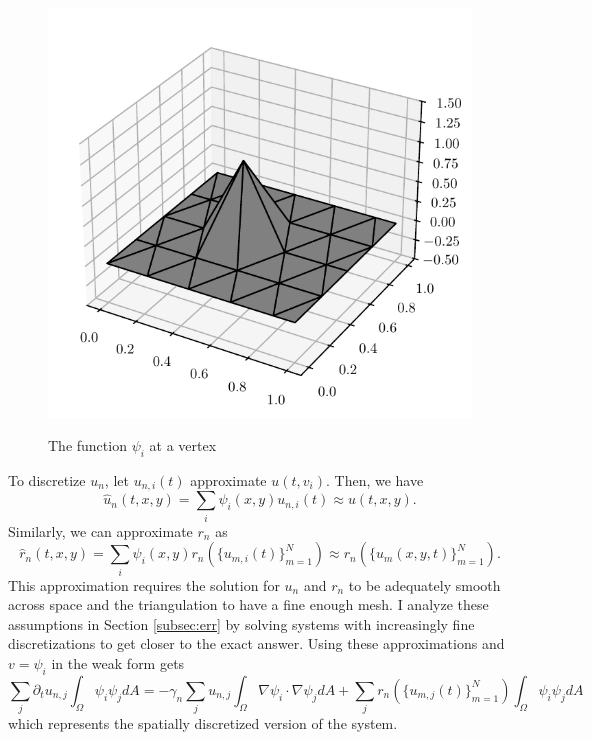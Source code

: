 \begin{figure}[t!]
    \centering
    \caption{The function $\psi_i$ at a vertex}
    \includegraphics{figures/psi.pdf}
    \label{fig:psi}
\end{figure}

To discretize $u_n$, let $u_{n, i} (t)$ approximate $u(t, v_i)$. Then, we have
\[
    \hat{u}_n (t, x, y) = \sum_i \psi_i (x, y) u_{n, i} (t) \approx u(t, x, y).
\]
Similarly, we can approximate $r_n$ as
\[
    \hat{r}_n (t, x, y) = \sum_i \psi_i (x, y) r_n \left(\{u_{m, i} (t)\}_{m = 1}^N\right) \approx r_n(\{u_{m} (x, y, t)\}_{m = 1}^N).
\]
This approximation requires the solution for $u_n$ and $r_n$ to be adequately smooth across space and the triangulation to have a fine enough mesh. I analyze these assumptions in Section \ref{subsec:err} by solving systems with increasingly fine discretizations to get closer to the exact answer. Using these approximations and $v = \psi_i$ in the weak form gets
\[
    \sum_j \partial_t u_{n, j} \int_\Omega \psi_i \psi_j dA = -\gamma_n \sum_j u_{n, j} \int_\Omega \nabla \psi_i \cdot \nabla \psi_j dA + \sum_j r_n \left(\{u_{m, j} (t)\}_{m = 1}^N\right) \int_\Omega \psi_i \psi_j dA
\]
which represents the spatially discretized version of the system.

